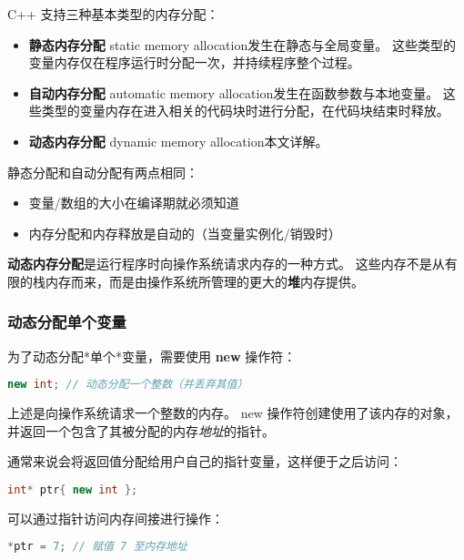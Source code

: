 \documentclass[../../LearnCpp.tex]{subfiles}
\begin{document}

C++ 支持三种基本类型的内存分配：

\begin{itemize}
    \item \textbf{静态内存分配} static memory allocation发生在静态与全局变量。
          这些类型的变量内存仅在程序运行时分配一次，并持续程序整个过程。
    \item \textbf{自动内存分配} automatic memory allocation发生在函数参数与本地变量。
          这些类型的变量内存在进入相关的代码块时进行分配，在代码块结束时释放。
    \item \textbf{动态内存分配} dynamic memory allocation本文详解。
\end{itemize}

静态分配和自动分配有两点相同：

\begin{itemize}
    \item 变量/数组的大小在编译期就必须知道
    \item 内存分配和内存释放是自动的（当变量实例化/销毁时）
\end{itemize}

\textbf{动态内存分配}是运行程序时向操作系统请求内存的一种方式。
这些内存不是从有限的栈内存而来，而是由操作系统所管理的更大的\textbf{堆}内存提供。

\subsubsection*{动态分配单个变量}

为了动态分配*单个*变量，需要使用 \textbf{new} 操作符：

\begin{lstlisting}[language=C++]
new int; // 动态分配一个整数（并丢弃其值）
\end{lstlisting}

上述是向操作系统请求一个整数的内存。
new 操作符创建使用了该内存的对象，并返回一个包含了其被分配的内存\textit{地址}的指针。

通常来说会将返回值分配给用户自己的指针变量，这样便于之后访问：

\begin{lstlisting}[language=C++]
int* ptr{ new int };
\end{lstlisting}

可以通过指针访问内存间接进行操作：

\begin{lstlisting}[language=C++]
*ptr = 7; // 赋值 7 至内存地址
\end{lstlisting}
\end{document}
